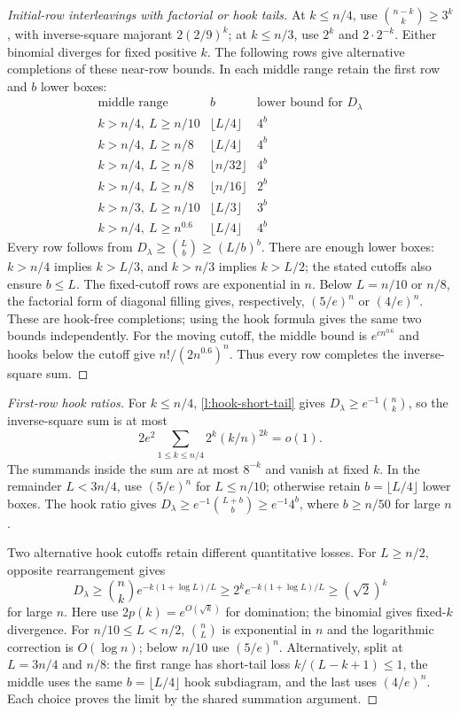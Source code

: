 \begin{proof}[Initial-row interleavings with factorial or hook tails]
At $k\le n/4$, use $\binom{n-k}k\ge3^k$, with inverse-square
majorant $2(2/9)^k$; at $k\le n/3$, use $2^k$ and
$2\cdot2^{-k}$. Either binomial diverges for fixed positive $k$.
The following rows give alternative completions of these near-row
bounds. In each middle range retain the first row and $b$ lower boxes:
\[
\begin{array}{c|c|c}
 \text{middle range}&b&\text{lower bound for }D_\lambda\\ \hline
 k>n/4,\ L\ge n/10&\lfloor L/4\rfloor&4^b\\
 k>n/4,\ L\ge n/8&\lfloor L/4\rfloor&4^b\\
 k>n/4,\ L\ge n/8&\lfloor n/32\rfloor&4^b\\
 k>n/4,\ L\ge n/8&\lfloor n/16\rfloor&2^b\\
 k>n/3,\ L\ge n/10&\lfloor L/3\rfloor&3^b\\
 k>n/4,\ L\ge n^{0.6}&\lfloor L/4\rfloor&4^b
\end{array}
\]
Every row follows from $D_\lambda\ge\binom Lb\ge(L/b)^b$.
There are enough lower boxes: $k>n/4$ implies $k>L/3$,
and $k>n/3$ implies $k>L/2$; the stated cutoffs also ensure
$b\le L$. The fixed-cutoff rows are exponential in $n$.
Below $L=n/10$ or $n/8$, the factorial form of diagonal filling
gives, respectively, $(5/e)^n$ or $(4/e)^n$.
These are hook-free completions; using the hook formula gives
the same two bounds independently. For the moving cutoff,
the middle bound is $e^{cn^{0.6}}$ and hooks below the cutoff give
$n!/(2n^{0.6})^n$. Thus every row completes the inverse-square sum.
\end{proof}

\begin{proof}[First-row hook ratios]
For $k\le n/4$, \eqref{l:hook-short-tail} gives
$D_\lambda\ge e^{-1}\binom nk$, so the inverse-square sum is at most
\[
 2e^2\sum_{1\le k\le n/4}2^k(k/n)^{2k}=o(1).
\]
The summands inside the sum are at most $8^{-k}$ and vanish at
fixed $k$. In the remainder $L<3n/4$, use $(5/e)^n$ for
$L\le n/10$; otherwise retain $b=\lfloor L/4\rfloor$ lower boxes.
The hook ratio gives $D_\lambda\ge e^{-1}\binom{L+b}b\ge e^{-1}4^b$,
where $b\ge n/50$ for large $n$.

Two alternative hook cutoffs retain different quantitative losses.
For $L\ge n/2$, opposite rearrangement gives
\[
 D_\lambda\ge\binom nk e^{-k(1+\log L)/L}
 \ge2^k e^{-k(1+\log L)/L}\ge(\sqrt2)^k
\]
for large $n$. Here use $2p(k)=e^{O(\sqrt k)}$ for domination;
the binomial gives fixed-$k$ divergence. For $n/10\le L<n/2$,
$\binom nL$ is exponential in $n$ and the logarithmic correction
is $O(\log n)$; below $n/10$ use $(5/e)^n$.
Alternatively, split at $L=3n/4$ and $n/8$: the first range has
short-tail loss $k/(L-k+1)\le1$, the middle uses the same
$b=\lfloor L/4\rfloor$ hook subdiagram, and the last uses $(4/e)^n$.
Each choice proves the limit by the shared summation argument.
\end{proof}

